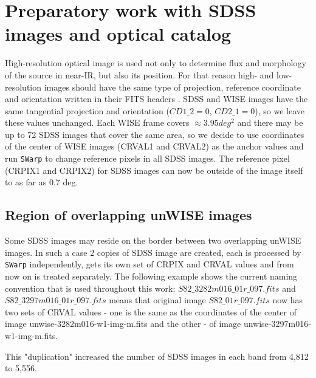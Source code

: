\section{Preparatory work with SDSS images and optical catalog}
	
	High-resolution optical image is used not only to determine flux and morphology of the source in near-IR, but also its position. For that reason high- and low-resolution images should have the same type of projection, reference coordinate and orientation written in their FITS headers \citep{Pence2010}. SDSS and WISE images have the same tangential projection and orientation ($CD1\_2=0$, $CD2\_1=0$), so we leave these values unchanged. Each WISE frame covers $\approx 3.95 deg^{2}$ and there may be up to 72 SDSS images that cover the same area, so we decide to use coordinates of the center of WISE images (CRVAL1 and CRVAL2) as the anchor values and run {\tt SWarp} \citep{Bertin2002} to change reference pixels in all SDSS images. The reference pixel (CRPIX1 and CRPIX2) for SDSS images can now be outside of the image itself to as far as 0.7 deg. 
	
\subsection{Region of overlapping unWISE images}

Some SDSS images may reside on the border between two overlapping unWISE images. In such a case 2 copies of SDSS image are created, each is processed by {\tt SWarp} independently, gets its own set of CRPIX and CRVAL values and from now on is treated separately. 
The following example shows the current naming convention that is used throughout this work: $S82\_3282m016\_01r\_097.fits$ and $S82\_3297m016\_01r\_097.fits$ means that original image $S82\_01r\_097.fits$ now has two sets of CRVAL values - one is the same as the coordinates of the center of image unwise-3282m016-w1-img-m.fits and the other - of image unwise-3297m016-w1-img-m.fits.

This "duplication" increased the number of SDSS images in each band from 4,812 to 5,556.
	
